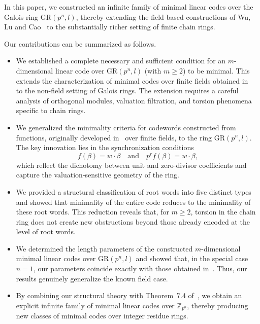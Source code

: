 \documentclass[10pt]{article}
\theoremstyle{definition}
\begin{document}
In this paper, we constructed an infinite family of minimal linear codes over the Galois ring $\mathrm{GR}(p^n,l)$, thereby extending the field-based constructions of Wu, Lu and Cao~\cite{WuLuCao} to the substantially richer setting of finite chain rings.

\medskip

Our contributions can be summarized as follows.

\begin{itemize}
\item[(1)] We established a complete necessary and sufficient condition for an $m$-dimensional linear code over $\mathrm{GR}(p^n,l)$ (with $m\ge2$) to be minimal.
This extends the characterization of minimal codes over finite fields obtained in~\cite{ChatterjeeMesnager} to the non-field setting of Galois rings.
The extension requires a careful analysis of orthogonal modules, valuation filtration, and torsion phenomena specific to chain rings.

\item[(2)] We generalized the minimality criteria for codewords constructed from functions, originally developed in~\cite{WuLuCao} over finite fields, to the ring $\mathrm{GR}(p^n,l)$.
The key innovation lies in the synchronization conditions
\[
f(\beta)=w\cdot\beta
\quad\text{and}\quad
p^r f(\beta)=w\cdot\beta,
\]
which reflect the dichotomy between unit and zero-divisor coefficients and capture the valuation-sensitive geometry of the ring.

\item[(3)] We provided a structural classification of root words into five distinct types and showed that minimality of the entire code reduces to the minimality of these root words.
This reduction reveals that, for $m\ge2$, torsion in the chain ring does not create new obstructions beyond those already encoded at the level of root words.

\item[(4)] We determined the length parameters of the constructed $m$-dimensional minimal linear codes over $\mathrm{GR}(p^n,l)$ and showed that, in the special case $n=1$, our parameters coincide exactly with those obtained in~\cite{WeiXiaXiwang}.
Thus, our results genuinely generalize the known field case.

\item[(5)] By combining our structural theory with Theorem~7.4 of~\cite{MajiMesnagerSarkar}, we obtain an explicit infinite family of minimal linear codes over $\mathbb{Z}_{p^n}$, thereby producing new classes of minimal codes over integer residue rings.
\end{itemize}
\end{document}
